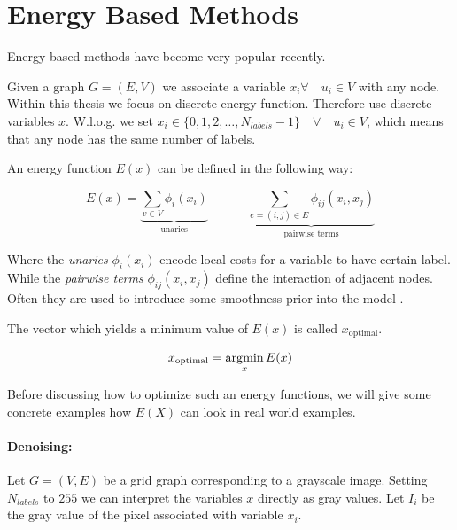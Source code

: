 \section{Energy Based Methods}\label{sec:energy_based_methods}

Energy based methods have become very popular recently.

Given a graph $G = (E,V)$ we 
associate  a variable $ x_i \forall \quad u_i \in V$ with any node.
Within this thesis we focus on discrete energy function.
Therefore use discrete variables $x$.
W.l.o.g. we set  $ x_i   \in \{ 0,1,2,\ldots, N_{labels}-1 \} \quad \forall \quad u_i \in V$,
which means that any node has the same number of labels.

An energy function $E(x)$ can be  defined  in the following way:

\begin{equation} \label{eq:gm_energy}
    E(x) = 
    \underbrace{
        \sum_{v \in V} \phi_i(x_i)
    }_{\text{unaries}}
     \quad +  \quad
    \underbrace{
        \sum_{e=(i,j) \in E } \phi_{ij}(x_i,x_j) 
    }_{\text{pairwise terms}}
\end{equation}



Where the \emph{unaries} $\phi_i(x_i)$ encode local costs
for a variable to have certain label.
While the \emph{pairwise terms} $\phi_{ij}(x_i,x_j) $ define the interaction of adjacent nodes.
Often they are used to introduce some smoothness prior
into the model \citep{szeliski_2008_pami}.


The vector which yields a minimum value of $E(x)$
is called $x_{\text{optimal}}$.


\begin{equation} \label{eq:gm_argmin}
x_{\text{optimal}} = \operatorname*{\arg\!\min}_{x}  E(x)
\end{equation}


Before discussing how to optimize such an energy functions,
we will give some concrete examples how $E(X)$ 
can look in real world examples.

\paragraph{Denoising:}


Let $G=(V,E)$ be a grid graph corresponding to
a grayscale image.
Setting $N_{labels}$ to $255$ we can interpret  the variables $x$ directly as
gray values.
Let $I_i$ be the gray value of the pixel associated with variable $x_i$.

